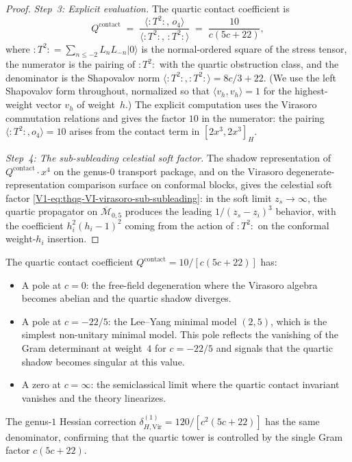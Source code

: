 \begin{proof}
\medskip\noindent
\emph{Step~3: Explicit evaluation.}\;
The quartic contact coefficient is
\[
Q^{\mathrm{contact}}
\;=\;
\frac{\langle :T^2:,\, o_4 \rangle}
 {\langle :T^2:,\, :T^2: \rangle}
\;=\;
\frac{10}{c(5c + 22)},
\]
where $:T^2: = \sum_{n \leq -2} L_n L_{-n} |0\rangle$ is the
normal-ordered square of the stress tensor, the numerator is the
pairing of $:T^2:$ with the quartic obstruction class, and the
denominator is the Shapovalov norm $\langle :T^2:, :T^2: \rangle
= 8c/3 + 22$. (We use the left Shapovalov form throughout,
normalized so that $\langle v_h, v_h \rangle = 1$ for the
highest-weight vector $v_h$ of weight~$h$.) The explicit computation
uses the Virasoro commutation relations and gives the factor $10$ in
the numerator: the pairing $\langle :T^2:, o_4 \rangle = 10$ arises
from the contact term in $[2x^3, 2x^3]_H$.

\medskip\noindent
\emph{Step~4: The sub-subleading celestial soft factor.}\;
The shadow representation of $Q^{\mathrm{contact}}\cdot x^4$
on the genus-$0$ transport package, and on the Virasoro
degenerate-representation comparison surface on conformal blocks,
gives the celestial soft factor
\eqref{V1-eq:thqg-VI-virasoro-sub-subleading}: in the soft limit
$z_s \to \infty$, the quartic propagator on
$\overline{\mathcal{M}}_{0,5}$ produces the leading
$1/(z_s - z_i)^3$ behavior, with the coefficient
$h_i^2(h_i-1)^2$ coming from the action of $:T^2:$ on the
conformal weight-$h_i$ insertion.
\end{proof}

\begin{remark}
The quartic contact coefficient
$Q^{\mathrm{contact}} = 10/[c(5c+22)]$ has:
\begin{itemize}
\item A pole at $c = 0$: the free-field degeneration where
 the Virasoro algebra becomes abelian and the quartic shadow
 diverges.
\item A pole at $c = -22/5$: the Lee--Yang minimal model
 $(2,5)$, which is the simplest non-unitary minimal model.
 This pole reflects the vanishing of the Gram determinant at
 weight~$4$ for $c = -22/5$ and signals that the quartic
 shadow becomes singular at this value.
\item A zero at $c = \infty$: the semiclassical limit where the
 quartic contact invariant vanishes and the theory linearizes.
\end{itemize}
The genus-$1$ Hessian correction
$\delta_{H,\mathrm{Vir}}^{(1)} = 120/[c^2(5c+22)]$ has the same
denominator, confirming that the quartic tower is controlled
by the single Gram factor $c(5c+22)$.
\end{remark}

